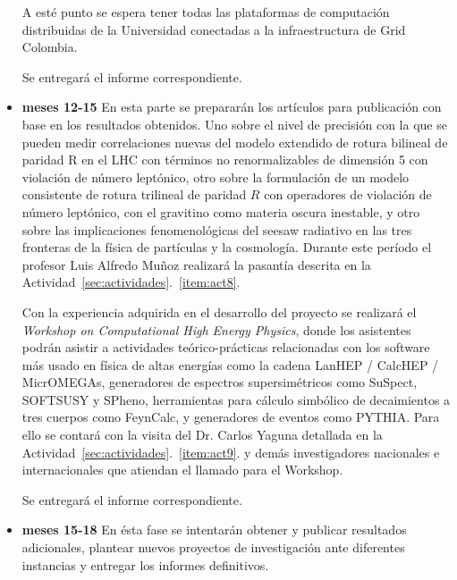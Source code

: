 \begin{itemize}
  A esté punto se espera tener todas las plataformas de computación
  distribuidas de la Universidad conectadas a la infraestructura de
  Grid Colombia.

  Se entregará el informe correspondiente.

\item \textbf{meses 12-15} En esta parte se prepararán los artículos
  para publicación con base en los resultados obtenidos. Uno sobre el
  nivel de precisión con la que se pueden medir correlaciones nuevas
  del modelo extendido de rotura bilineal de paridad R en el LHC con
  términos no renormalizables de dimensión 5 con violación de número
  leptónico, otro sobre la formulación de un modelo consistente de
  rotura trilineal de paridad $R$ con operadores de violación de
  número leptónico, con el gravitino como materia oscura inestable, y
  otro sobre las implicaciones fenomenológicas del seesaw radiativo en
  las tres fronteras de la física de partículas y la
  cosmología. Durante este período el profesor Luis Alfredo Muñoz
  realizará la pasantía descrita en la
  Actividad~\ref{sec:actividades}.~\ref{item:act8}.

  Con la experiencia adquirida en el desarrollo del proyecto se
  realizará el \emph{Workshop on Computational High Energy Physics},
  donde los asistentes podrán asistir a actividades teórico-prácticas
  relacionadas con los software más usado en física de altas energías
  como la cadena LanHEP / CalcHEP / MicrOMEGAs, generadores de espectros
  supersimétricos como SuSpect, SOFTSUSY y SPheno, herramientas para
  cálculo simbólico de decaimientos a tres cuerpos como FeynCalc, y
  generadores de eventos como PYTHIA. Para ello se contará con la
  visita del Dr. Carlos Yaguna detallada en la
  Actividad~\ref{sec:actividades}.~\ref{item:act9}. y demás
  investigadores nacionales e internacionales que atiendan el llamado
  para el Workshop.

  Se entregará el informe correspondiente.
\item \textbf{meses 15-18}
  En ésta fase se intentarán obtener y publicar resultados
  adicionales, plantear nuevos proyectos de investigación ante
  diferentes instancias y entregar los informes definitivos.
\end{itemize}

